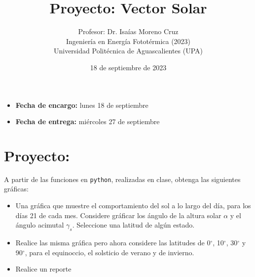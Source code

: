 \documentclass[spanish, letterpaper,12]{article}
\begin{document}

 
 
\title{Proyecto: Vector Solar}
\author{Profesor: Dr. Isaías Moreno Cruz\\
  Ingeniería en Energía Fototérmica (2023)\\
Universidad Politécnica de Aguascalientes (UPA)}
\date{18 de septiembre de 2023}

\maketitle

\begin{itemize}[leftmargin=*, noitemsep]
\item \textbf{Fecha de encargo:} lunes 18 de septiembre
\item \textbf{Fecha de entrega:} miércoles 27 de septiembre
\end{itemize}
\thispagestyle{fancy}

\section*{Proyecto:}

A partir de las funciones en \verb=python=, realizadas en clase, obtenga las siguientes gráficas:

\begin{itemize}
\item Una gráfica que muestre el comportamiento del sol a lo largo del día, para los días 21 de cada mes. Considere gráficar los ángulo de la altura solar $\alpha$ y el ángulo acimutal $\gamma_s$. Seleccione una latitud de algún estado. 
\item Realice las misma gráfica pero ahora considere las latitudes de 0$^\circ$, 10$^\circ$, 30$^\circ$ y 90$^\circ$, para el equinoccio, el solsticio de verano y de invierno.
\item Realice un reporte
\end{itemize}
\end{document}
